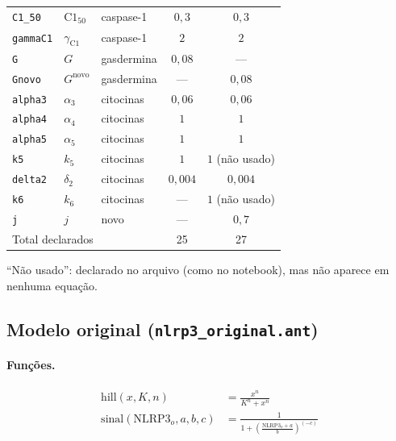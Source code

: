 \documentclass[11pt]{article}
\begin{document}
\begin{longtable}{lllcc}
\texttt{C1\_50}     & $\mathrm{C1}_{50}$         & caspase-1 & $0{,}3$  & $0{,}3$ \\
\texttt{gammaC1}    & $\gamma_{\mathrm{C1}}$     & caspase-1 & $2$      & $2$ \\
\texttt{G}          & $G$                        & gasdermina & $0{,}08$ & --- \\
\texttt{Gnovo}      & $G^{\mathrm{novo}}$        & gasdermina & ---      & $0{,}08$ \\
\texttt{alpha3}     & $\alpha_3$                 & citocinas & $0{,}06$  & $0{,}06$ \\
\texttt{alpha4}     & $\alpha_4$                 & citocinas & $1$       & $1$ \\
\texttt{alpha5}     & $\alpha_5$                 & citocinas & $1$       & $1$ \\
\texttt{k5}         & $k_5$                      & citocinas & $1$       & $1$ (não usado) \\
\texttt{delta2}     & $\delta_2$                 & citocinas & $0{,}004$ & $0{,}004$ \\
\texttt{k6}         & $k_6$                      & citocinas & ---       & $1$ (não usado) \\
\texttt{j}          & $j$                        & novo      & ---       & $0{,}7$ \\
\midrule
\multicolumn{3}{l}{Total declarados} & 25 & 27 \\
\bottomrule
\end{longtable}

``Não usado'': declarado no arquivo (como no notebook), mas não aparece em nenhuma equação.

\subsection{Modelo original (\texttt{nlrp3\_original.ant})}

\paragraph{Funções.}
\begin{align}
\mathrm{hill}(x, K, n) &= \frac{x^n}{K^n + x^n} \\
\mathrm{sinal}(\mathrm{NLRP3}_o, a, b, c) &= \frac{1}{1 + \left(\frac{\mathrm{NLRP3}_o + a}{b}\right)^{(-c)}}
\end{align}
\end{document}
